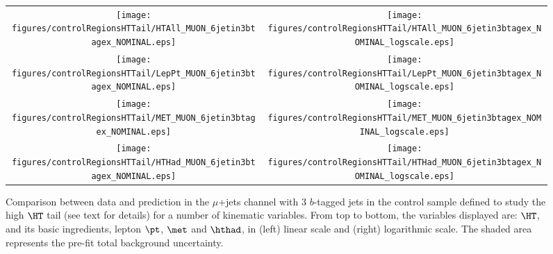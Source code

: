 \begin{figure}[htbp]
\begin{center}
\begin{tabular}{cc}
%
\texttt{[image: figures/controlRegionsHTTail/HTAll\_MUON\_6jetin3btagex\_NOMINAL.eps]} &
\texttt{[image: figures/controlRegionsHTTail/HTAll\_MUON\_6jetin3btagex\_NOMINAL\_logscale.eps]} \\
\texttt{[image: figures/controlRegionsHTTail/LepPt\_MUON\_6jetin3btagex\_NOMINAL.eps]} &
\texttt{[image: figures/controlRegionsHTTail/LepPt\_MUON\_6jetin3btagex\_NOMINAL\_logscale.eps]} \\
\texttt{[image: figures/controlRegionsHTTail/MET\_MUON\_6jetin3btagex\_NOMINAL.eps]} &
\texttt{[image: figures/controlRegionsHTTail/MET\_MUON\_6jetin3btagex\_NOMINAL\_logscale.eps]} \\
\texttt{[image: figures/controlRegionsHTTail/HTHad\_MUON\_6jetin3btagex\_NOMINAL.eps]} &
\texttt{[image: figures/controlRegionsHTTail/HTHad\_MUON\_6jetin3btagex\_NOMINAL\_logscale.eps]} \\

\end{tabular}\caption{\small {Comparison between data and prediction in the $\mu$+jets channel with 3 $b$-tagged jets in the control sample
defined to study the high $\HT$ tail (see text for details)  for a number of kinematic
variables. From top to bottom, the variables displayed are: $\HT$, and its basic ingredients, lepton $\pt$, $\met$ and $\hthad$,
in (left) linear scale and (right) logarithmic scale.
The shaded area represents the pre-fit total background uncertainty.}}
\label{fig:MUON_controlHTTail_3btagex_1}
\end{center}
\end{figure}
